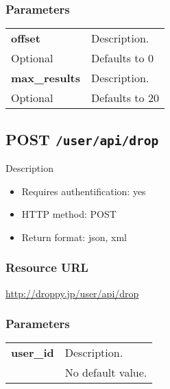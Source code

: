 \documentclass[11pt,a4paper]{article}
\newcommand{\content}[1]{\begin{minipage}{10cm}\vspace{2mm}#1\vspace{2mm}\end{minipage}}
\begin{document}
  \subsubsection*{Parameters}
  \begin{table}[h]
    \begin{center}
      \begin{tabular}{l l}
        \hline 
      \textbf{offset} & \content{Description. }
      \\
      Optional & Defaults to 0\\
      \hline
      \textbf{max\_results} & \content{Description. }
      \\
      Optional & Defaults to 20\\
      \hline
      \end{tabular}
    \end{center}
  \end{table}
  
      \newpage
      
      
  \subsection*{POST {\tt /user/api/drop}}
  Description
  \begin{itemize}
  \item Requires authentification: yes
  \item HTTP method: POST
  \item Return format: json, xml
  \end{itemize}
  \subsubsection*{Resource URL}
  \url{http://droppy.jp/user/api/drop}
  \subsubsection*{Parameters}
  \begin{table}[h]
    \begin{center}
      \begin{tabular}{l l}
        \hline 
      \textbf{user\_id} & \content{Description. }
      \\
       & No default value.\\
      \hline
      \end{tabular}
    \end{center}
  \end{table}
  
\end{document}
